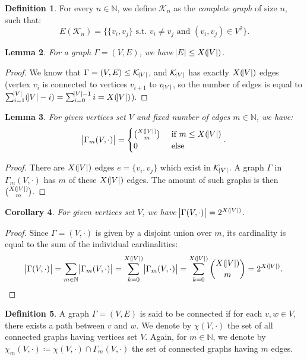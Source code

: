 \documentclass{article}
\newtheorem{lemma}{Lemma}[section]
\newtheorem{corollary}[lemma]{Corollary}
\theoremstyle{definition}
\newtheorem{definition}[lemma]{Definition}
\theoremstyle{remark}
\newcommand{\N}{\mathbb N}
\newcommand{\st}{\text{ s.t. }}
\begin{document}
		\begin{definition} For every $n \in \N$, we define $\mathcal K_n$ as the \textit{complete graph} of size $n$, such that:
		\[E(\mathcal K_n) = \{\{v_i, v_j\} \st v_i \neq v_j \text{ and } (v_i, v_j) \in V^2\}.\]
		\end{definition}

		\begin{lemma} For a graph $\Gamma = (V, E)$, we have $\abs E \leq X(\abs V)$.
		\end{lemma}

		\begin{proof} We know that $\Gamma = (V, E) \leq \mathcal K_{\abs V}$, and $\mathcal K_{\abs V}$ has exactly $X(\abs V)$ edges (vertex $v_i$ is connected
		to vertices $v_{i+1}$ to $v_{\abs V}$, so the number of edges is equal to $\sum_{i=1}^{\abs V}(\abs V - i) = \sum_{i=0}^{\abs V - 1}i = X(\abs V)$).
		\end{proof}

		\begin{lemma} For given vertices set $V$ and fixed number of edges $m \in \N$, we have:
		\[\abs {\Gamma_m(V, \cdot)} = \begin{cases}\binom {X(\abs V)}m &\text{ if } m \leq X(\abs V) \\0 &\text{ else}\end{cases}.\]
		\end{lemma}

		\begin{proof} There are $X(\abs V)$ edges $e = \{v_i, v_j\}$ which exist in $\mathcal K_{\abs V}$. A graph $\Gamma$ in $\Gamma_m(V, \cdot)$
		has $m$ of these $X(\abs V)$ edges. The amount of such graphs is then $\binom {X(\abs V)}m$.
		\end{proof}

		\begin{corollary} For given vertices set $V$, we have $\abs {\Gamma(V, \cdot)} = 2^{X(\abs V)}$.
		\end{corollary}

		\begin{proof} Since $\Gamma = (V, \cdot)$ is given by a disjoint union over $m$, its cardinality is equal to the sum of the individual cardinalities:
		\[\abs {\Gamma(V, \cdot)} = \sum_{m \in \N}\abs {\Gamma_m(V, \cdot)} = \sum_{k=0}^{X(\abs V)}\abs {\Gamma_m(V, \cdot)}
			= \sum_{k=0}^{X(\abs V)}\binom {X(\abs V)}m = 2^{X(\abs V)}.\]
		\end{proof}

		\begin{definition} A graph $\Gamma = (V, E)$ is said to be connected if for each $v, w \in V$, there exists a path between $v$ and $w$. We denote by
		$\chi(V, \cdot)$ the set of all connected graphs having vertices set $V$. Again, for $m \in \N$, we denote by $\chi_m(V, \cdot) \coloneqq
		\chi(V, \cdot) \cap \Gamma_m(V, \cdot)$ the set of connected graphs having $m$ edges.
		\end{definition}
\end{document}

